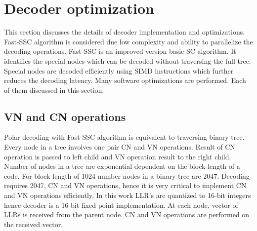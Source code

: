 \section{Decoder optimization}
This section discusses the details of decoder implementation and optimizations. Fast-SSC algorithm is considered due low complexity and ability to parallelize the decoding operations. Fast-SSC is an improved version basic SC algorithm. It identifies the special nodes which can be decoded without traversing the full tree. Special nodes are decoded efficiently using SIMD instructions which further reduces the decoding latency. Many software optimizations are performed. Each of them discussed in this section.

\subsection{VN and CN operations}
Polar decoding with Fast-SSC algorithm is equivalent to traversing binary tree. Every node in a tree involves one pair CN and VN operations. Result of CN operation is passed to left child and VN operation result to the right child. Number of nodes in a tree are exponential dependent on the block-length of a code. For block length of 1024 number nodes in a binary tree are 2047. Decoding requires 2047, CN and VN operations, hence it is very critical to implement CN and VN operations efficiently. In this work LLR's are quantized to 16-bit integers hence decoder is a 16-bit fixed point implementation. At each node, vector of LLRs is received from the parent node. CN and VN operations are performed on the received vector.

